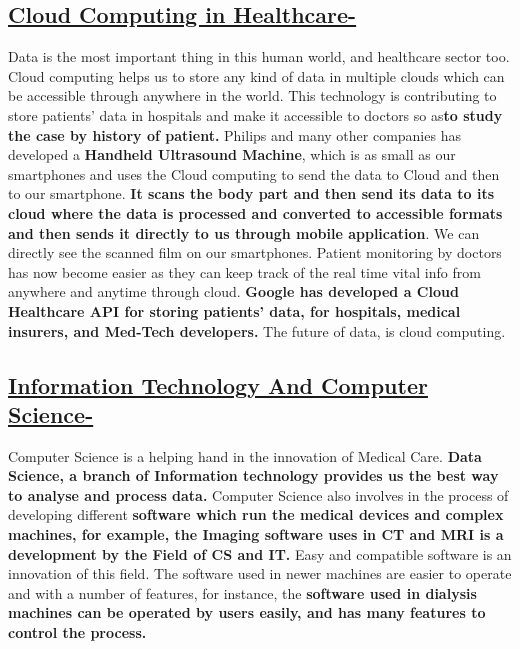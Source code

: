 \documentclass[18pt]{article}
\begin{document}
\subsection{\underline{Cloud Computing in Healthcare-}}
Data is the most important thing in this human world, and healthcare sector too. Cloud computing helps us to store any kind of data in multiple clouds which can be accessible through anywhere in the world. \newline This technology is contributing to store patients’ data in hospitals and make it accessible to doctors so as\textbf{to study the case by history of patient.}
\newline Philips and many other companies has developed a \textbf{Handheld Ultrasound Machine}, which is as small as our smartphones and uses the Cloud computing to send the data to Cloud and then to our smartphone. \textbf{It scans the body part and then send its data to its cloud where the data is processed and converted to accessible formats and then sends it directly to us through mobile application}. We can directly see the scanned film on our smartphones.
\newline Patient monitoring by doctors has now become easier as they can keep track of the real time vital info from anywhere and anytime through cloud. 
\newline \textbf{Google has developed a Cloud Healthcare API for storing patients’ data, for hospitals, medical insurers, and Med-Tech developers.}
The future of data, is cloud computing.
\subsection{\underline{Information Technology And Computer Science-}}
Computer Science is a helping hand in the innovation of Medical Care. \textbf {Data Science, a branch of Information technology provides us the best way to analyse and process data.}
\newline Computer Science also involves in the process of developing different \textbf{software which run the medical devices and complex machines, for example, the Imaging software uses in CT and MRI is a development by the Field of CS and IT.}
\newline Easy and compatible software is an innovation of this field. The software used in newer machines are easier to operate and with a number of features, for instance, the \textbf{software used in dialysis machines can be operated by users easily, and has many features to control the process.}
\end{document}
